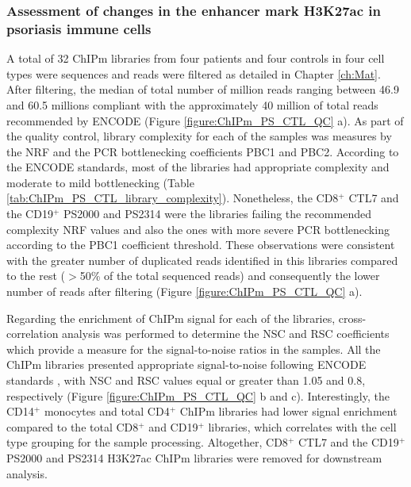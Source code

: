 \subsubsection{Assessment of changes in the enhancer mark H3K27ac in psoriasis immune cells}
A total of 32 ChIPm libraries from four patients and four controls in four cell types were sequences and reads were filtered as detailed in Chapter \ref{ch:Mat}. After filtering, the median of total number of million reads ranging between 46.9 and 60.5 millions compliant with the approximately 40 million of total reads recommended by ENCODE (Figure \ref{figure:ChIPm_PS_CTL_QC} a). As part of the quality control, library complexity for each of the samples was measures by the NRF and the PCR bottlenecking coefficients PBC1 and PBC2. According to the ENCODE standards, most of the libraries had appropriate complexity and moderate to mild bottlenecking (Table \ref{tab:ChIPm_PS_CTL_library_complexity}). Nonetheless, the CD8$^+$ CTL7 and the CD19$^+$ PS2000 and PS2314 were the libraries failing the recommended complexity NRF values and also the ones with more severe PCR bottlenecking according to the PBC1 coefficient threshold. These observations were consistent with the greater number of duplicated reads identified in this libraries compared to the rest ($>$50\% of the total sequenced reads) and consequently the lower number of reads after filtering (Figure \ref{figure:ChIPm_PS_CTL_QC} a). 

Regarding the enrichment of ChIPm signal for each of the libraries, cross-correlation analysis was performed to determine the NSC and RSC coefficients which provide a measure for the signal-to-noise ratios in the samples. All  the ChIPm libraries presented appropriate signal-to-noise following ENCODE standards \parencite{Landt2012}, with NSC and RSC values equal or greater than 1.05 and 0.8, respectively (Figure \ref{figure:ChIPm_PS_CTL_QC} b and c). Interestingly, the CD14$^+$ monocytes and total CD4$^+$ ChIPm libraries had lower signal enrichment compared to the total CD8$^+$ and CD19$^+$ libraries, which correlates with the cell type grouping for the sample processing. Altogether, CD8$^+$ CTL7 and the CD19$^+$ PS2000 and PS2314 H3K27ac ChIPm libraries were removed for downstream analysis.



